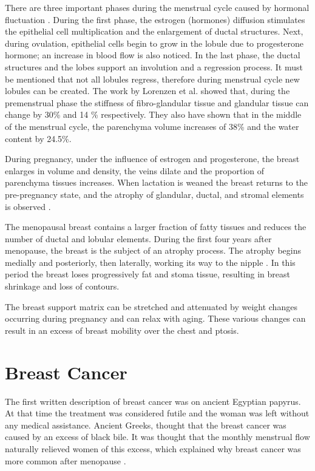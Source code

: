There are three important phases during the menstrual cycle caused by hormonal fluctuation \citep{andolina2011mammographic}. During the first phase, the estrogen (hormones) diffusion stimulates the epithelial cell multiplication and the enlargement of ductal structures. Next, during ovulation, epithelial cells begin to grow in the lobule due to progesterone hormone; an increase in blood flow is also noticed. In the last phase, the ductal structures and the lobes support an involution and a regression process. It must be mentioned that not all lobules regress, therefore during menstrual cycle new lobules can be created.   The work by Lorenzen et al. \citep{lorenzen_menstrual-cycle_2003} showed that, during the premenstrual phase the stiffness of fibro-glandular tissue and glandular tissue can change by 30\% and 14 \% respectively. They also have shown that in the middle of the menstrual cycle, the parenchyma volume increases of 38\% and the water content by 24.5\%.

During pregnancy, under the influence of estrogen and progesterone, the breast enlarges in volume and density, the veins dilate and the proportion of parenchyma tissues increases.  When lactation is weaned the breast returns to the pre-pregnancy state, and the atrophy of glandular, ductal, and stromal elements  is observed \citep{pandya_breast_2011}.

The menopausal breast contains a larger fraction of fatty tissues and reduces the number of ductal and lobular elements. During the first four years after menopause, the breast is the subject of an atrophy process. The atrophy begins medially and posteriorly, then laterally, working its way to the nipple \citep{andolina2011mammographic}. In this period the breast loses progressively fat and stoma tissue, resulting in breast shrinkage and loss of contours.

 The breast support matrix can be stretched and attenuated by weight changes occurring during pregnancy and can relax with aging. These various changes can result in an excess of breast mobility over the chest and ptosis. 

\section{Breast Cancer}\label{section:breastcancer}

The first written description of breast cancer was on ancient Egyptian papyrus. At that time the treatment was considered futile and the woman was left without any medical assistance. Ancient Greeks, thought that the breast cancer was caused by an excess of black bile. It was thought that the monthly menstrual flow naturally relieved women of this excess, which explained why breast cancer was more common after menopause \citep{andolina2011mammographic}.

